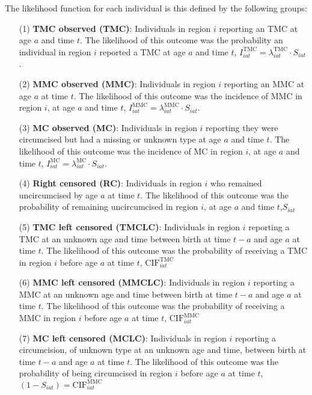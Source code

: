 \documentclass{article}
\begin{document}
\begin{appendix}
\noindent The likelihood function for each individual is this defined by the following groups:
\begin{itemize}
	\item[(1)] \textbf{TMC observed (TMC)}: Individuals in region $i$ reporting an TMC at age $a$ and time $t$. The likelihood of this outcome was the probability an individual in region $i$ reported a TMC at age $a$ and time $t$, $I^{\text{TMC}}_{iat} = \lambda^{\text{TMC}}_{iat}\cdot S_{iat}$. 
	\item[(2)] \textbf{MMC observed (MMC)}: Individuals in region $i$ reporting an MMC at age $a$ at time $t$. The likelihood of this outcome was the incidence of MMC in region $i$, at age $a$ and time $t$, $I^{\text{MMC}}_{iat} = \lambda^{\text{MMC}}_{iat}\cdot S_{iat}$. 
	\item[(3)] \textbf{MC observed (MC)}: Individuals in region $i$ reporting they were circumcised but had a missing or unknown type at age $a$ and time $t$. The likelihood of this outcome was the incidence of MC in region $i$, at age $a$ and time $t$, $I^{\text{MC}}_{iat} = \lambda^{\text{MC}}_{iat}\cdot S_{iat}$. 
	\item[(4)] \textbf{Right censored (RC)}: Individuals in region $i$ who remained uncircumcised by age $a$ at time $t$. The likelihood of this outcome was the probability of remaining uncircumcised in region $i$, at age $a$ and time $t$,$S_{iat}$
	\item[(5)] \textbf{TMC left censored (TMCLC)}: Individuals in region $i$ reporting a TMC at an unknown age and time between birth at time $t-a$ and age $a$ at time $t$. The likelihood of this outcome was the probability of receiving a TMC in region $i$ before age $a$ at time $t$, $\text{CIF}^{\text{TMC}}_{iat}$
	\item[(6)] \textbf{MMC left censored (MMCLC)}: Individuals in region $i$ reporting a MMC at an unknown age and time between birth at time $t-a$ and age $a$ at time $t$. The likelihood of this outcome was the probability of receiving a MMC in region $i$ before age $a$ at time $t$, $\text{CIF}^{\text{MMC}}_{iat}$ 
	\item[(7)] \textbf{MC left censored (MCLC)}: Individuals in region $i$ reporting a circumcision, of unknown type at an unknown age and time, between birth at time $t-a$ and age $a$ at time $t$. The likelihood of this outcome was the probability of being circumcised in region $i$ before age $a$ at time $t$, $(1-S_{iat}) = \text{CIF}^{\text{MMC}}_{iat}$ 
\end{itemize}


\end{appendix}
\end{document}
